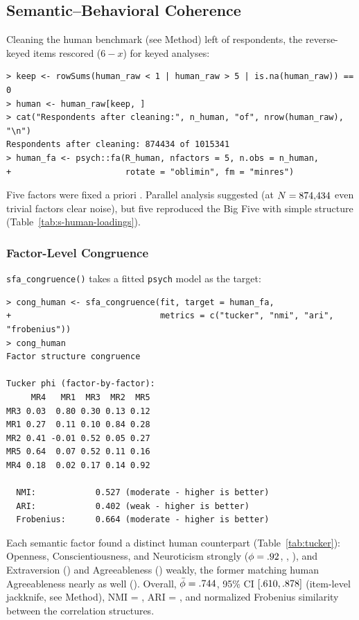 \subsection{Semantic--Behavioral Coherence}

Cleaning the human benchmark (see Method) left \valNHuman{} of
\valNHumanRaw{} respondents, the \valNRev{} reverse-keyed items rescored
($6 - x$) for keyed analyses:

{\scriptsize
\begin{verbatim}
> keep <- rowSums(human_raw < 1 | human_raw > 5 | is.na(human_raw)) == 0
> human <- human_raw[keep, ]
> cat("Respondents after cleaning:", n_human, "of", nrow(human_raw), "\n")
Respondents after cleaning: 874434 of 1015341
> human_fa <- psych::fa(R_human, nfactors = 5, n.obs = n_human,
+                       rotate = "oblimin", fm = "minres")
\end{verbatim}
}

Five factors were fixed a priori \citep{goldberg-1990}. Parallel
analysis suggested \valHumanPaKWord{} (at $N = 874{,}434$ even trivial
factors clear noise), but five reproduced the Big Five with simple
structure (Table~\ref{tab:s-human-loadings}).

\subsubsection{Factor-Level Congruence}

\texttt{sfa\_congruence()} takes a fitted \texttt{psych} model as the
target:

{\scriptsize
\begin{verbatim}
> cong_human <- sfa_congruence(fit, target = human_fa,
+                              metrics = c("tucker", "nmi", "ari", "frobenius"))
> cong_human
Factor structure congruence

Tucker phi (factor-by-factor):
     MR4   MR1  MR3  MR2  MR5
MR3 0.03  0.80 0.30 0.13 0.12
MR1 0.27  0.11 0.10 0.84 0.28
MR2 0.41 -0.01 0.52 0.05 0.27
MR5 0.64  0.07 0.52 0.11 0.16
MR4 0.18  0.02 0.17 0.14 0.92

  NMI:            0.527 (moderate - higher is better)
  ARI:            0.402 (weak - higher is better)
  Frobenius:      0.664 (moderate - higher is better)
\end{verbatim}
}

Each semantic factor found a distinct human counterpart
(Table~\ref{tab:tucker}): Openness, Conscientiousness, and Neuroticism
strongly ($\phi = .92$, \valPhiC, \valPhiN), and Extraversion (\valPhiE) and Agreeableness
(\valPhiA) weakly, the former matching human Agreeableness nearly as well
(\valPhiEA). Overall, $\bar{\phi} = .744$, 95\% CI
$[.610, .878]$ (item-level jackknife, see Method),
NMI = \valNmiTheory, ARI = \valAriTheory, and
normalized Frobenius similarity \valFrob between the correlation
structures.

